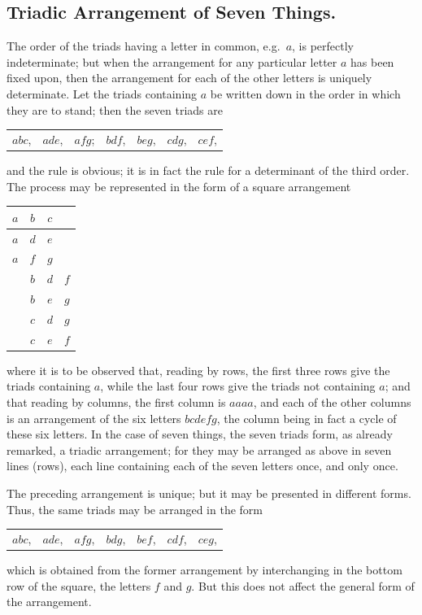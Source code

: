 \documentclass[11pt,a4paper]{book}
\begin{document}
\subsection*{Triadic Arrangement of Seven Things.}

The order of the triads having a letter in common, e.g.\ $a$, is perfectly indeterminate; but when the arrangement for any particular letter $a$ has been fixed upon, then the arrangement for each of the other letters is uniquely determinate. Let the triads containing $a$ be written down in the order in which they are to stand; then the seven triads are
\begin{center}
\begin{tabular}{lllllll}
$abc$, & $ade$, & $afg$; & $bdf$, & $beg$, & $cdg$, & $cef$,
\end{tabular}
\end{center}
and the rule is obvious; it is in fact the rule for a determinant of the third order. The process may be represented in the form of a square arrangement
\begin{center}
\begin{tabular}{|c|c|c|c|}
\hline
$a$ & $b$ & $c$ & \\
\hline
$a$ & $d$ & $e$ & \\
\hline
$a$ & $f$ & $g$ & \\
\hline
   & $b$ & $d$ & $f$ \\
\hline
   & $b$ & $e$ & $g$ \\
\hline
   & $c$ & $d$ & $g$ \\
\hline
   & $c$ & $e$ & $f$ \\
\hline
\end{tabular}
\end{center}
where it is to be observed that, reading by rows, the first three rows give the triads containing $a$, while the last four rows give the triads not containing $a$; and that reading by columns, the first column is $aaaa$, and each of the other columns is an arrangement of the six letters $bcdefg$, the column being in fact a cycle of these six letters. In the case of seven things, the seven triads form, as already remarked, a triadic arrangement; for they may be arranged as above in seven lines (rows), each line containing each of the seven letters once, and only once.

The preceding arrangement is unique; but it may be presented in different forms. Thus, the same triads may be arranged in the form
\begin{center}
\begin{tabular}{lllllll}
$abc$, & $ade$, & $afg$, & $bdg$, & $bef$, & $cdf$, & $ceg$,
\end{tabular}
\end{center}
which is obtained from the former arrangement by interchanging in the bottom row of the square, the letters $f$ and $g$. But this does not affect the general form of the arrangement.
\end{document}
